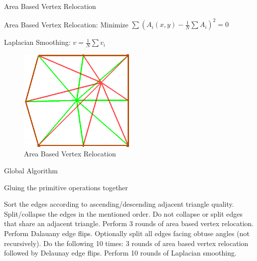 \documentclass{beamer}
\begin{document}
\begin{frame}[plain]{Area Based Vertex Relocation}

  Area Based Vertex Relocation: Minimize $ \sum ( A_i(x,y) -
  \frac{1}{N} \sum A_i )^2 = 0 $

  \vspace{0.5cm}
  
  Laplacian Smoothing: $ v = \frac{1}{N} \sum v_i$

  \vspace{1cm}
  \begin{figure}
    \includegraphics[width=0.5\textwidth]{../image/area_0.png}
    \caption{Area Based Vertex Relocation}
  \end{figure}

\end{frame}


\begin{frame}[plain]{Global Algorithm}
  
\begin{algorithm}[H]
  \caption{Gluing the primitive operations together}
  \begin{algorithmic}[1]
    
    \State Sort the edges according to ascending/descending adjacent
    triangle quality.
    \State Split/collapse the edges in the mentioned order. 
    \State Do not collapse or split edges that share an adjacent triangle.
    \State Perform 3 rounds of area based vertex relocation.
    \State Perform Dalauany edge flips.
    \EndWhile
    \State Optionally split all edges facing obtuse angles (not recursively).
    \State Do the following 10 times: 3 rounds of area based vertex relocation
    followed by Delaunay edge flips.
    \State Perform 10 rounds of Laplacian smoothing.
  \end{algorithmic}
\end{algorithm}

\end{frame}
\end{document}
